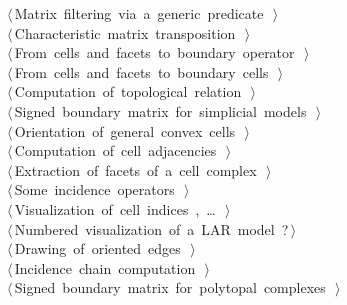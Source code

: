 \documentclass[11pt,oneside]{article}    %
\begin{document}
\begin{flushleft}
\begin{list}{}{}
\mbox{}\verb@@\hbox{$\langle\,$Matrix filtering via a generic predicate\nobreak\ {\footnotesize {}}$\,\rangle$}\verb@@\\
\mbox{}\verb@@\hbox{$\langle\,$Characteristic matrix transposition\nobreak\ {\footnotesize {}}$\,\rangle$}\verb@@\\
\mbox{}\verb@@\hbox{$\langle\,$From cells and facets to boundary operator\nobreak\ {\footnotesize {}}$\,\rangle$}\verb@@\\
\mbox{}\verb@@\hbox{$\langle\,$From cells and facets to boundary cells\nobreak\ {\footnotesize {}}$\,\rangle$}\verb@@\\
\mbox{}\verb@@\hbox{$\langle\,$Computation of topological relation\nobreak\ {\footnotesize {}}$\,\rangle$}\verb@@\\
\mbox{}\verb@@\hbox{$\langle\,$Signed boundary matrix for simplicial models\nobreak\ {\footnotesize {}}$\,\rangle$}\verb@@\\
\mbox{}\verb@@\hbox{$\langle\,$Orientation of general convex cells\nobreak\ {\footnotesize {}}$\,\rangle$}\verb@@\\
\mbox{}\verb@@\hbox{$\langle\,$Computation of cell adjacencies\nobreak\ {\footnotesize {}}$\,\rangle$}\verb@@\\
\mbox{}\verb@@\hbox{$\langle\,$Extraction of facets of a cell complex\nobreak\ {\footnotesize {}}$\,\rangle$}\verb@@\\
\mbox{}\verb@@\hbox{$\langle\,$Some incidence operators\nobreak\ {\footnotesize {}}$\,\rangle$}\verb@@\\
\mbox{}\verb@@\hbox{$\langle\,$Visualization of cell indices\nobreak\ {\footnotesize {}, \ldots\ }$\,\rangle$}\verb@@\\
\mbox{}\verb@@\hbox{$\langle\,$Numbered visualization of a LAR model\nobreak\ {\footnotesize ?}$\,\rangle$}\verb@@\\
\mbox{}\verb@@\hbox{$\langle\,$Drawing of oriented edges\nobreak\ {\footnotesize {}}$\,\rangle$}\verb@@\\
\mbox{}\verb@@\hbox{$\langle\,$Incidence chain computation\nobreak\ {\footnotesize {}}$\,\rangle$}\verb@@\\
\mbox{}\verb@@\hbox{$\langle\,$Signed boundary matrix for polytopal complexes\nobreak\ {\footnotesize {}}$\,\rangle$}\verb@@\\

\end{list}
\end{flushleft}
\end{document}

